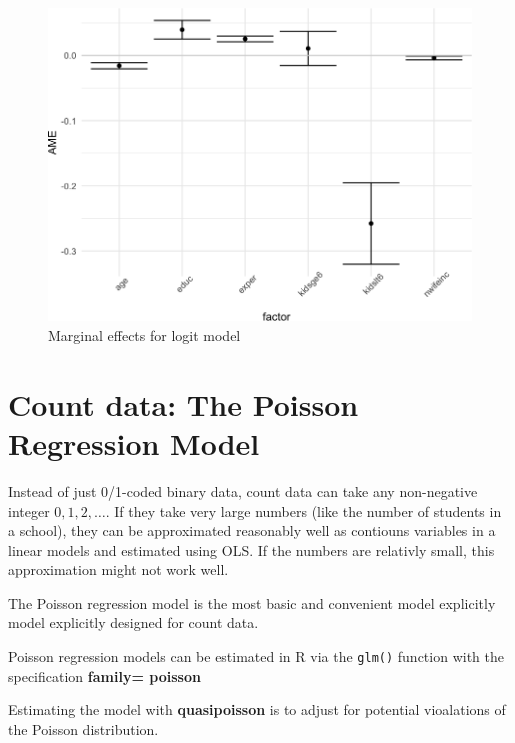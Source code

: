 \documentclass[]{book}
\begin{document}
\begin{figure}

{\centering \includegraphics[width=0.8\linewidth]{MEM5220_R_files/figure-latex/fig23-1} 

}

\caption{Marginal effects for logit model}\label{fig:fig23}
\end{figure}

\hypertarget{count-data-the-poisson-regression-model}{%
\section{Count data: The Poisson Regression
Model}\label{count-data-the-poisson-regression-model}}

Instead of just 0/1-coded binary data, count data can take any
non-negative integer \(0, 1, 2, \dots\). If they take very large numbers
(like the number of students in a school), they can be approximated
reasonably well as contiouns variables in a linear models and estimated
using OLS. If the numbers are relativly small, this approximation might
not work well.

The Poisson regression model is the most basic and convenient model
explicitly model explicitly designed for count data.

Poisson regression models can be estimated in R via the \texttt{glm()}
function with the specification \textbf{family= poisson}

Estimating the model with \textbf{quasipoisson} is to adjust for
potential vioalations of the Poisson distribution.
\end{document}
